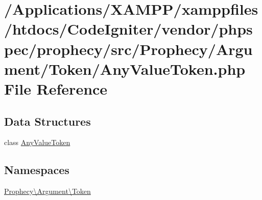 \hypertarget{_any_value_token_8php}{}\section{/\+Applications/\+X\+A\+M\+P\+P/xamppfiles/htdocs/\+Code\+Igniter/vendor/phpspec/prophecy/src/\+Prophecy/\+Argument/\+Token/\+Any\+Value\+Token.php File Reference}
\label{_any_value_token_8php}
\subsection*{Data Structures}
\begin{DoxyCompactItemize}
\item 
class \mbox{\hyperlink{class_prophecy_1_1_argument_1_1_token_1_1_any_value_token}{Any\+Value\+Token}}
\end{DoxyCompactItemize}
\subsection*{Namespaces}
\begin{DoxyCompactItemize}
\item 
 \mbox{\hyperlink{namespace_prophecy_1_1_argument_1_1_token}{Prophecy\textbackslash{}\+Argument\textbackslash{}\+Token}}
\end{DoxyCompactItemize}
